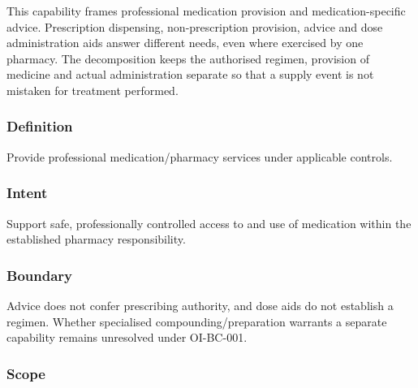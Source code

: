 This capability frames professional medication provision and medication-specific advice. Prescription dispensing, non-prescription provision, advice and dose administration aids answer different needs, even where exercised by one pharmacy. The decomposition keeps the authorised regimen, provision of medicine and actual administration separate so that a supply event is not mistaken for treatment performed.

\subsubsection*{Definition}

Provide professional medication/\allowbreak{}pharmacy services under applicable controls.

\subsubsection*{Intent}

Support safe, professionally controlled access to and use of medication within the established pharmacy responsibility.

\subsubsection*{Boundary}

Advice does not confer prescribing authority, and dose aids do not establish a regimen. Whether specialised compounding/\allowbreak{}preparation warrants a separate capability remains unresolved under OI-BC-001.

\subsubsection*{Scope}
